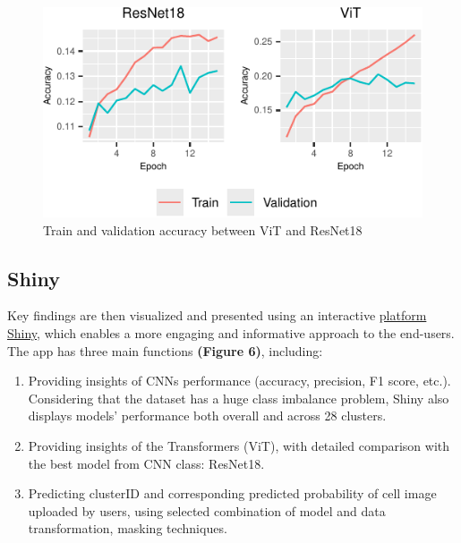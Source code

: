\documentclass[letterpaper,9pt,twocolumn,twoside,]{pinp}
\begin{document}
\begin{figure}[h]

{\centering \includegraphics{Image02_final_report_files/figure-latex/unnamed-chunk-5-1} 

}

\caption{Train and validation accuracy between ViT and ResNet18}\label{fig:unnamed-chunk-5}
\end{figure}

\hypertarget{shiny}{%
\subsection{Shiny}\label{shiny}}

Key findings are then visualized and presented using an interactive
\href{https://gitparth12.shinyapps.io/data3888_imaging_021/}{platform
Shiny}, which enables a more engaging and informative approach to the
end-users. The app has three main functions \textbf{(Figure 6)},
including:

\begin{enumerate}
\def\labelenumi{\arabic{enumi}.}
\item
  Providing insights of CNNs performance (accuracy, precision, F1 score,
  etc.). Considering that the dataset has a huge class imbalance
  problem, Shiny also displays models' performance both overall and
  across 28 clusters.
\item
  Providing insights of the Transformers (ViT), with detailed comparison
  with the best model from CNN class: ResNet18.
\item
  Predicting clusterID and corresponding predicted probability of cell
  image uploaded by users, using selected combination of model and data
  transformation, masking techniques.
\end{enumerate}
\end{document}
